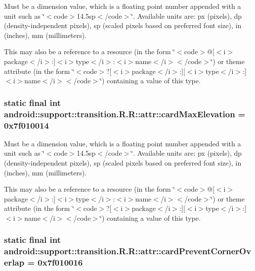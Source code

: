 Must be a dimension value, which is a floating point number appended with a unit such as \char`\"{}$<$code$>$14.5sp$<$/code$>$\char`\"{}. Available units are: px (pixels), dp (density-independent pixels), sp (scaled pixels based on preferred font size), in (inches), mm (millimeters). 

This may also be a reference to a resource (in the form \char`\"{}$<$code$>$@\mbox{[}$<$i$>$package$<$/i$>$:\mbox{]}$<$i$>$type$<$/i$>$:$<$i$>$name$<$/i$>$$<$/code$>$\char`\"{}) or theme attribute (in the form \char`\"{}$<$code$>$?\mbox{[}$<$i$>$package$<$/i$>$:\mbox{]}\mbox{[}$<$i$>$type$<$/i$>$:\mbox{]}$<$i$>$name$<$/i$>$$<$/code$>$\char`\"{}) containing a value of this type. \hypertarget{classandroid_1_1support_1_1transition_1_1_r_1_1attr_d75df55bd14893cd47cbc5728b5e4332}{
\subsubsection[{cardMaxElevation}]{\setlength{\rightskip}{0pt plus 5cm}static final int android::support::transition.R.R::attr::cardMaxElevation = 0x7f010014}}
\label{classandroid_1_1support_1_1transition_1_1_r_1_1attr_d75df55bd14893cd47cbc5728b5e4332}


Must be a dimension value, which is a floating point number appended with a unit such as \char`\"{}$<$code$>$14.5sp$<$/code$>$\char`\"{}. Available units are: px (pixels), dp (density-independent pixels), sp (scaled pixels based on preferred font size), in (inches), mm (millimeters). 

This may also be a reference to a resource (in the form \char`\"{}$<$code$>$@\mbox{[}$<$i$>$package$<$/i$>$:\mbox{]}$<$i$>$type$<$/i$>$:$<$i$>$name$<$/i$>$$<$/code$>$\char`\"{}) or theme attribute (in the form \char`\"{}$<$code$>$?\mbox{[}$<$i$>$package$<$/i$>$:\mbox{]}\mbox{[}$<$i$>$type$<$/i$>$:\mbox{]}$<$i$>$name$<$/i$>$$<$/code$>$\char`\"{}) containing a value of this type. \hypertarget{classandroid_1_1support_1_1transition_1_1_r_1_1attr_f770b16fdcaeaffba748bda13f2d96f6}{
\subsubsection[{cardPreventCornerOverlap}]{\setlength{\rightskip}{0pt plus 5cm}static final int android::support::transition.R.R::attr::cardPreventCornerOverlap = 0x7f010016}}
\label{classandroid_1_1support_1_1transition_1_1_r_1_1attr_f770b16fdcaeaffba748bda13f2d96f6}



